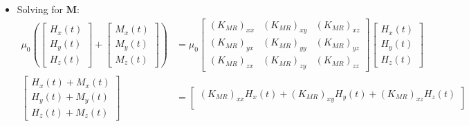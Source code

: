 \begin{itemize}
\begin{align*}
\begin{bmatrix}
        E_x(t) \\
        E_y(t) \\
        E_z(t)
      \end{bmatrix}
    \end{align*}
    where \( \mathbf{X}_E \) is also a rank-2 tensor with 9 elements and
    equals,
    \begin{align*}
      \mathbf{X}_E(x,y,z,t) = \begin{bmatrix}
        (K_{ER})_{xx} - 1 & (K_{ER})_{xy} & (K_{ER})_{xz} \\
        (K_{ER})_{yx} & (K_{ER})_{yy} - 1 & (K_{ER})_{yz} \\
        (K_{ER})_{zx} & (K_{ER})_{zy} & (K_{ER})_{zz} - 1
      \end{bmatrix}
    \end{align*}
  \item Solving for \( \mathbf{M} \):
    \begin{align*}
      \mu_0 \left(
      \begin{bmatrix}
        H_x(t) \\
        H_y(t) \\
        H_z(t)
      \end{bmatrix} +
      \begin{bmatrix}
        M_x(t) \\
        M_y(t) \\
        M_z(t)
      \end{bmatrix} \right)
      &= \mu_0
      \begin{bmatrix}
        (K_{MR})_{xx} & (K_{MR})_{xy} & (K_{MR})_{xz} \\
        (K_{MR})_{yx} & (K_{MR})_{yy} & (K_{MR})_{yz} \\
        (K_{MR})_{zx} & (K_{MR})_{zy} & (K_{MR})_{zz}
      \end{bmatrix}
      \begin{bmatrix}
        H_x(t) \\
        H_y(t) \\
        H_z(t)
      \end{bmatrix} \\
      \begin{bmatrix}
        H_x(t) + M_x(t) \\
        H_y(t) + M_y(t) \\
        H_z(t) + M_z(t)
      \end{bmatrix}
      &=
      \begin{bmatrix}
        (K_{MR})_{xx} H_x(t) + (K_{MR})_{xy} H_y(t) + (K_{MR})_{xz} H_z(t) \\

\end{bmatrix}
\end{align*}
\end{itemize}
